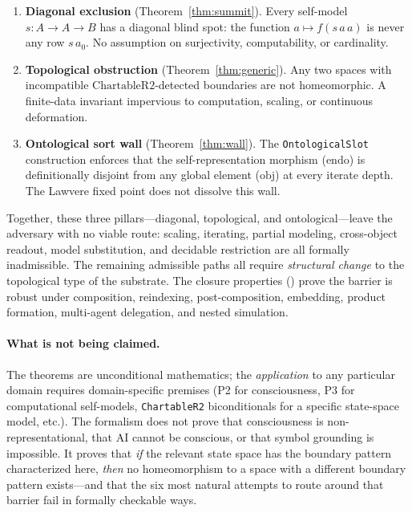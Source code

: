 \documentclass[11pt]{article}
\begin{document}
\begin{keybox}[title=Three pillars of representational incompleteness]
\begin{enumerate}[label=\textbf{Pillar~\arabic*.},leftmargin=3.5em,itemsep=0.6ex]
\item \textbf{Diagonal exclusion}
  (Theorem~\ref{thm:summit}).  Every self-model $s : A \to A \to B$
  has a diagonal blind spot: the function $a \mapsto f(s\,a\,a)$ is
  never any row $s\,a_0$.  No assumption on surjectivity,
  computability, or cardinality.
\item \textbf{Topological obstruction}
  (Theorem~\ref{thm:generic}).  Any two spaces with incompatible
  $\mathrm{ChartableR2}$-detected boundaries are not homeomorphic.
  A finite-data invariant impervious to computation, scaling, or
  continuous deformation.
\item \textbf{Ontological sort wall}
  (Theorem~\ref{thm:wall}).  The \texttt{OntologicalSlot}
  construction enforces that the self-representation morphism
  ($\mathrm{endo}$) is definitionally disjoint from any global
  element ($\mathrm{obj}$) at every iterate depth.  The Lawvere
  fixed point does not dissolve this wall.
\end{enumerate}
Together, these three pillars---diagonal, topological, and
ontological---leave the adversary with no viable route: scaling,
iterating, partial modeling, cross-object readout, model substitution,
and decidable restriction are all formally inadmissible.  The
remaining admissible paths all require \emph{structural change} to the
topological type of the substrate.  The closure properties
() prove the barrier is robust under
composition, reindexing, post-composition, embedding, product
formation, multi-agent delegation, and nested simulation.
\end{keybox}

\paragraph{What is not being claimed.}
The theorems are unconditional mathematics; the \emph{application} to
any particular domain requires domain-specific premises (P2 for
consciousness, P3 for computational self-models,
\texttt{ChartableR2} biconditionals for a specific
state-space model, etc.).  The formalism does not prove that
consciousness is non-representational, that AI cannot be conscious, or
that symbol grounding is impossible.  It proves that \emph{if} the
relevant state space has the boundary pattern characterized here,
\emph{then} no homeomorphism to a space with a different boundary
pattern exists---and that the six most natural attempts to route around
that barrier fail in formally checkable ways.
\end{document}
